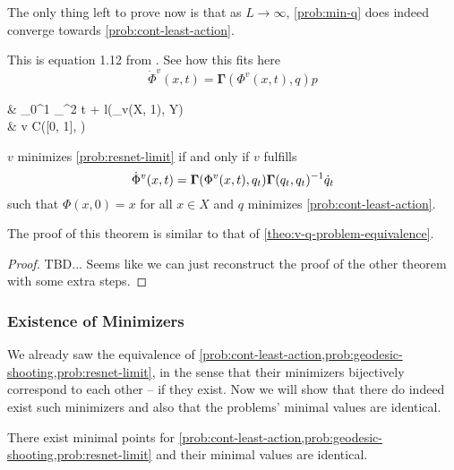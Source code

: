 The only thing left to prove now is that as $L \rightarrow \infty$, \cref{prob:min-q} does indeed converge towards \cref{prob:cont-least-action}.



This is equation 1.12 from \cite{owhadi20}.
See how this fits here
\begin{equation}
	\label{eq:phi-v-differential-equation}
	\dot{\Phi}^v(x, t) = \mathbf{\Gamma}(\Phi^v(x, t), q) p
\end{equation}

\begin{problem}
	\label{prob:resnet-limit}
	\begin{cases}
		&  \int_{0}^{1} _^2 t
		+ l(\phi_v(X, 1), Y)\\
		& v \in C([0, 1], )\\
	\end{cases}
\end{problem}

\begin{theorem}
	\label{theo:v-q-continuous-problem-equivalence}
	$v$ minimizes \cref{prob:resnet-limit} if and only if $v$ fulfills
	\begin{equation}
			\dot{\Phi}^v(x, t) = \mathbf{\Gamma}(\Phi^v(x, t), q_t) \mathbf{\Gamma}(q_t, q_t)^{-1} \dot{q}_t
	\end{equation}
	such that $\Phi(x, 0) = x$ for all $x \in X$ and $q$ minimizes \cref{prob:cont-least-action}.
\end{theorem}
The proof of this theorem is similar to that of \cref{theo:v-q-problem-equivalence}.
\begin{proof}
	TBD... Seems like we can just reconstruct the proof of the other theorem with some extra steps.
\end{proof}


\subsubsection{Existence of Minimizers}

We already saw the equivalence of \cref{prob:cont-least-action,prob:geodesic-shooting,prob:resnet-limit}, in the sense that their minimizers bijectively correspond to each other -- if they exist.
Now we will show that there do indeed exist such minimizers and also that the problems' minimal values are identical.
\begin{theorem}
		There exist minimal points for \cref{prob:cont-least-action,prob:geodesic-shooting,prob:resnet-limit} and their minimal values are identical.
\end{theorem}

